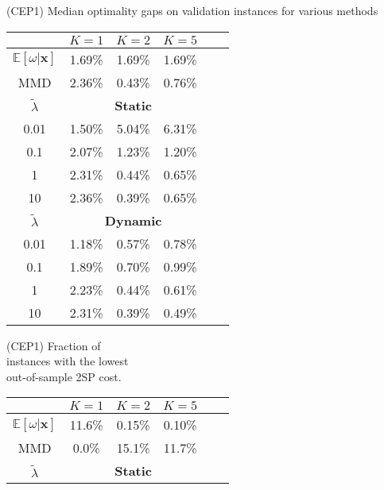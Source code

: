     
\begin{table}[h]
    \centering
        \begin{minipage}{0.49\textwidth}
        \centering
        \TABLE
        {(CEP1) Median optimality gaps on validation instances for various methods \label{tab:CEP1_gaps}}
        {
        \begin{tabular}{cccccc}
        \toprule
         & $K=1$ & $K=2$ & $K=5$ \\
        \midrule
        $\mathbb{E}[\omega | \mathbf{x}]$ & 1.69\% & 1.69\% & 1.69\% \\
        MMD & 2.36\% & 0.43\% & 0.76\% \\
        \midrule
        \multicolumn{1}{c}{$\tilde{\lambda}$} & \multicolumn{3}{c}{\textbf{Static}} \\
        \midrule
        0.01 & 1.50\% & 5.04\% & 6.31\% \\
        0.1  & 2.07\% & 1.23\% & 1.20\% \\
        1    & 2.31\% & 0.44\% & 0.65\% \\
        10   & 2.36\% & 0.39\% & 0.65\% \\
        \midrule
        \multicolumn{1}{c}{$\tilde{\lambda}$} &  \multicolumn{3}{c}{\textbf{Dynamic}} \\
        \midrule
        0.01 & 1.18\% & 0.57\% & 0.78\% \\
        0.1  & 1.89\% & 0.70\% & 0.99\% \\
        1    & 2.23\% & 0.44\% & 0.61\% \\
        10   & 2.31\% & 0.39\% & 0.49\% \\
        \bottomrule
        \end{tabular}}{}
    \end{minipage}
     \hfill
        \begin{minipage}{0.49\textwidth}
        \centering
        \TABLE
        {(CEP1) Fraction of \\ instances with the lowest \\ out-of-sample 2SP cost. \label{tab:CEP1_competition}}
        {
        \begin{tabular}{cccccc}
        \toprule
         & $K=1$ & $K=2$ & $K=5$ \\
        \midrule
        $\mathbb{E}[\omega | \mathbf{x}]$ & 11.6\% & 0.15\% & 0.10\% \\
        MMD & 0.0\% & 15.1\% & 11.7\% \\
        \midrule
        \multicolumn{1}{c}{$\tilde{\lambda}$} & \multicolumn{3}{c}{\textbf{Static}} \\

\end{tabular}}
\end{minipage}
\end{table}
